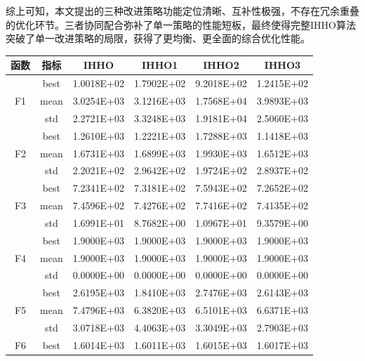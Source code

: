 \documentclass{wzuthesis}
\begin{document}
综上可知，本文提出的三种改进策略功能定位清晰、互补性极强，不存在冗余重叠的优化环节。三者协同配合弥补了单一策略的性能短板，最终使得完整IHHO算法突破了单一改进策略的局限，获得了更均衡、更全面的综合优化性能。



\begin{table}[htbp]
  \centering
  \small
  \label{tb:IHHO-ablation}%
    \begin{tabular}{cccccc}
    \toprule
    函数    & 指标    & IHHO  & IHHO1 & IHHO2 & IHHO3 \\
    \midrule
    \multirow{3}[1]{*}{F1} & best  & 1.0018E+02 & 1.7902E+02 & 9.2018E+02 & 1.2415E+02 \\
          & mean  & 3.0254E+03 & 3.1216E+03 & 1.7568E+04 & 3.9893E+03 \\
          & std   & 2.2721E+03 & 3.3248E+03 & 1.9181E+04 & 2.5060E+03 \\
    \multirow{3}[0]{*}{F2} & best  & 1.2610E+03 & 1.2221E+03 & 1.7288E+03 & 1.1418E+03 \\
          & mean  & 1.6731E+03 & 1.6899E+03 & 1.9930E+03 & 1.6512E+03 \\
          & std   & 2.2021E+02 & 2.9642E+02 & 1.9724E+02 & 2.8937E+02 \\
    \multirow{3}[0]{*}{F3} & best  & 7.2341E+02 & 7.3181E+02 & 7.5943E+02 & 7.2652E+02 \\
          & mean  & 7.4596E+02 & 7.4276E+02 & 7.7416E+02 & 7.4135E+02 \\
          & std   & 1.6991E+01 & 8.7682E+00 & 1.0967E+01 & 9.3579E+00 \\
    \multirow{3}[0]{*}{F4} & best  & 1.9000E+03 & 1.9000E+03 & 1.9000E+03 & 1.9000E+03 \\
          & mean  & 1.9000E+03 & 1.9000E+03 & 1.9000E+03 & 1.9000E+03 \\
          & std   & 0.0000E+00 & 0.0000E+00 & 0.0000E+00 & 0.0000E+00 \\
    \multirow{3}[0]{*}{F5} & best  & 2.6195E+03 & 1.8410E+03 & 2.7476E+03 & 2.6143E+03 \\
          & mean  & 7.4796E+03 & 6.3820E+03 & 6.5101E+03 & 6.6371E+03 \\
          & std   & 3.0718E+03 & 4.4063E+03 & 3.3049E+03 & 2.7903E+03 \\
    \multirow{3}[0]{*}{F6} & best  & 1.6014E+03 & 1.6011E+03 & 1.6015E+03 & 1.6017E+03 \\

\end{tabular}
\end{table}
\end{document}
